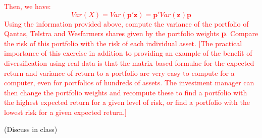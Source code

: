 \documentclass[12pt]{report}
\begin{document}
\noindent \textcolor{red}{Then, we have: $$Var(X) = Var(\textbf{p}'\textbf{z}) = \textbf{p}'Var(\textbf{z})\textbf{p}$$ Using the information provided above, compute the variance of the portfolio of Qantas, Telstra and Wesfarmers shares given by the portfolio weights \textbf{p}. Compare the risk of this portfolio with the risk of each individual asset. [The practical importance of this exercise in addition to providing an example of the benefit of diversification using real data is that the matrix based formulae for the expected return and variance of return to a portfolio are very easy to compute for a computer, even for portfolios of hundreds of assets. The investment manager can then change the portfolio weights and recompute these to find a portfolio with the highest expected return for a given level of risk, or find a portfolio with the lowest risk for a given expected return.]}

\noindent (Discuss in class)
\end{document}
